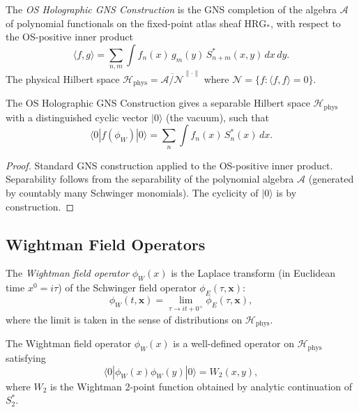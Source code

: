 \begin{definition}
\label{def:gns}
The \emph{OS Holographic GNS Construction} is the GNS completion of
the algebra $\mathcal{A}$ of polynomial functionals on the fixed-point
atlas sheaf $\mathrm{HRG}_{*}$, with respect to the OS-positive inner
product
\[
\langle f,g\rangle=\sum_{n,m}\int f_{n}(x)\,g_{m}(y)\,
  S_{n+m}^{*}(x,y)\,dx\,dy.
\]
The physical Hilbert space
$\mathcal{H}_{\mathrm{phys}}=\overline{\mathcal{A}/\mathcal{N}}^{\|\cdot\|}$
where $\mathcal{N}=\{f:\langle f,f\rangle=0\}$.
\end{definition}

\begin{theorem}
\label{thm:gns}
The OS Holographic GNS Construction gives a separable Hilbert space
$\mathcal{H}_{\mathrm{phys}}$ with a distinguished cyclic vector
$|0\rangle$ (the vacuum), such that
\[
\langle 0|f(\phi_{W})|0\rangle=\sum_{n}\int f_{n}(x)\,S_{n}^{*}(x)\,dx.
\]
\end{theorem}

\begin{proof}
Standard GNS construction applied to the OS-positive inner product.
Separability follows from the separability of the polynomial algebra
$\mathcal{A}$ (generated by countably many Schwinger monomials). The
cyclicity of $|0\rangle$ is by construction.
\end{proof}

\subsection{Wightman Field Operators}
\label{ssec:wightman_fields}

\begin{definition}
\label{def:wightman_field}
The \emph{Wightman field operator} $\phi_{W}(x)$ is the Laplace
transform (in Euclidean time $x^{0}=i\tau$) of the Schwinger field
operator $\phi_{E}(\tau,\mathbf{x})$:
\[
\phi_{W}(t,\mathbf{x})=\lim_{\tau\to it+0^{+}}\phi_{E}(\tau,\mathbf{x}),
\]
where the limit is taken in the sense of distributions on
$\mathcal{H}_{\mathrm{phys}}$.
\end{definition}

\begin{theorem}
\label{thm:wightman_field}
The Wightman field operator $\phi_{W}(x)$ is a well-defined operator
on $\mathcal{H}_{\mathrm{phys}}$ satisfying
\[
\langle 0|\phi_{W}(x)\phi_{W}(y)|0\rangle=W_{2}(x,y),
\]
where $W_{2}$ is the Wightman 2-point function obtained by analytic
continuation of $S_{2}^{*}$.
\end{theorem}

